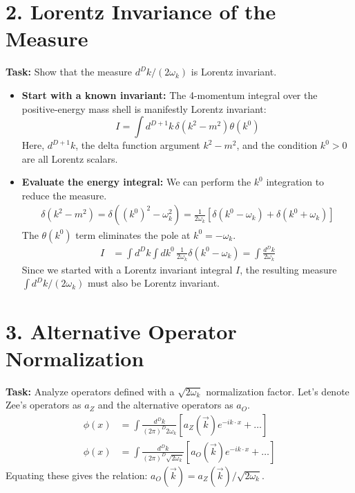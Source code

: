 \documentclass[11pt, a4paper]{article}
\begin{document}
\section*{2. Lorentz Invariance of the Measure}
\textbf{Task:} Show that the measure $d^Dk / (2\omega_k)$ is Lorentz invariant.
\begin{itemize}
    \item \textbf{Start with a known invariant:} The 4-momentum integral over the positive-energy mass shell is manifestly Lorentz invariant:
    \[ I = \int d^{D+1}k \, \delta(k^2 - m^2) \theta(k^0) \]
    Here, $d^{D+1}k$, the delta function argument $k^2-m^2$, and the condition $k^0 > 0$ are all Lorentz scalars.

    \item \textbf{Evaluate the energy integral:} We can perform the $k^0$ integration to reduce the measure.
    \begin{align*}
        \delta(k^2 - m^2) = \delta((k^0)^2 - \omega_k^2) = \frac{1}{2\omega_k} \left[ \delta(k^0 - \omega_k) + \delta(k^0 + \omega_k) \right]
    \end{align*}
    The $\theta(k^0)$ term eliminates the pole at $k^0 = -\omega_k$.
    \begin{align*}
        I &= \int d^Dk \int dk^0 \, \frac{1}{2\omega_k} \delta(k^0 - \omega_k) = \int \frac{d^Dk}{2\omega_k}
    \end{align*}
    Since we started with a Lorentz invariant integral $I$, the resulting measure $\int d^Dk/(2\omega_k)$ must also be Lorentz invariant.
\end{itemize}

\section*{3. Alternative Operator Normalization}
\textbf{Task:} Analyze operators defined with a $\sqrt{2\omega_k}$ normalization factor. Let's denote Zee's operators as $a_Z$ and the alternative operators as $a_O$.
\begin{align*}
    \phi(x) &= \int \frac{d^Dk}{(2\pi)^D 2\omega_k} [a_Z(\vec{k})e^{-ik\cdot x} + \dots] \\
    \phi(x) &= \int \frac{d^Dk}{(2\pi)^D \sqrt{2\omega_k}} [a_O(\vec{k})e^{-ik\cdot x} + \dots]
\end{align*}
Equating these gives the relation: $a_O(\vec{k}) = a_Z(\vec{k}) / \sqrt{2\omega_k}$.
\end{document}
